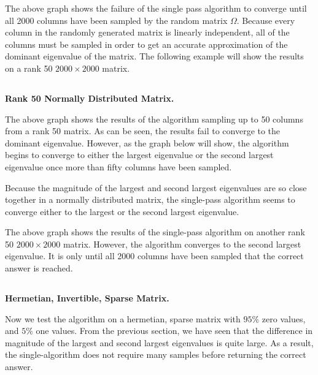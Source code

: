 \documentclass[11pt]{amsart}
\begin{document}

The above graph shows the failure of the single pass algorithm to converge until all 2000 columns have been sampled by the random matrix $\Omega$. Because every column in the randomly generated matrix is linearly independent, all of the columns must be sampled in order to get an accurate approximation of the dominant eigenvalue of the matrix. The following example will show the results on a rank 50 $2000 \times 2000$ matrix.

\subsection{}\textbf{Rank 50 Normally Distributed Matrix.}


The above graph shows the results of the algorithm sampling up to 50 columns from a rank 50 matrix. As can be seen, the results fail to converge to the dominant eigenvalue. However, as the graph below will show, the algorithm begins to converge to either the largest eigenvalue or the second largest eigenvalue once more than fifty columns have been sampled.


Because the magnitude of the largest and second largest eigenvalues are so close together in a normally distributed matrix, the single-pass algorithm seems to converge either to the largest or the second largest eigenvalue.
 

The above graph shows the results of the single-pass algorithm on another rank 50 $2000 \times 2000$ matrix. However, the algorithm converges to the second largest eigenvalue. It is only until all 2000 columns have been sampled that the correct answer is reached.

\subsection{}\textbf{Hermetian, Invertible, Sparse Matrix.}

Now we test the algorithm on a hermetian, sparse matrix with $95\%$ zero values, and $5\%$ one values. From the previous section, we have seen that the difference in magnitude of the largest and second largest eigenvalues is quite large. As a result, the single-algorithm does not require many samples before returning the correct answer.
\end{document}
